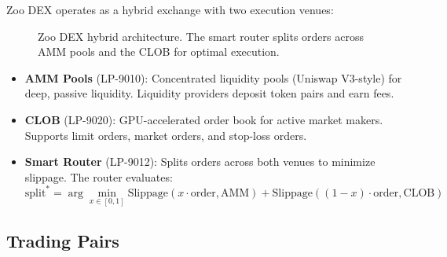 \documentclass[11pt,letterpaper]{article}
\begin{document}
Zoo DEX operates as a hybrid exchange with two execution venues:

\begin{figure}[t]
\centering
{}
\caption{Zoo DEX hybrid architecture. The smart router splits orders across AMM pools and the CLOB for optimal execution.}
\label{fig:architecture}
\end{figure}

\begin{itemize}
    \item \textbf{AMM Pools} (LP-9010): Concentrated liquidity pools (Uniswap V3-style) for deep, passive liquidity. Liquidity providers deposit token pairs and earn fees.

    \item \textbf{CLOB} (LP-9020): GPU-accelerated order book for active market makers. Supports limit orders, market orders, and stop-loss orders.

    \item \textbf{Smart Router} (LP-9012): Splits orders across both venues to minimize slippage. The router evaluates:
    \begin{equation}
    \text{split}^* = \arg\min_{x \in [0, 1]} \text{Slippage}(x \cdot \text{order}, \text{AMM}) + \text{Slippage}((1-x) \cdot \text{order}, \text{CLOB})
    \end{equation}
\end{itemize}

\subsection{Trading Pairs}
\end{document}
